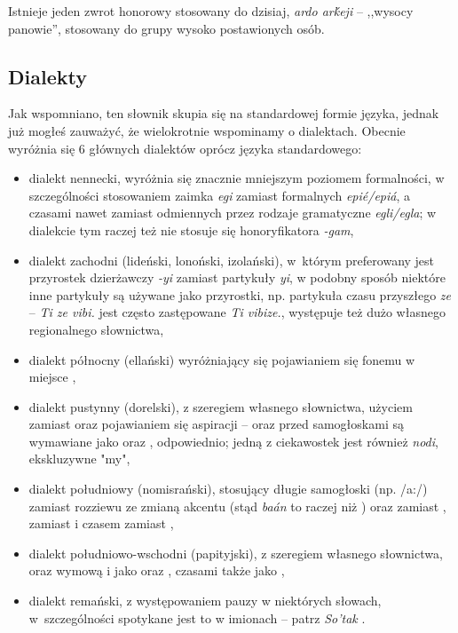 \begin{spacing}{1.1}
Istnieje jeden zwrot honorowy stosowany do dzisiaj, \emph{ardo arḱeji} --
,,wysocy panowie'', stosowany do grupy wysoko postawionych osób.

\subsection{Dialekty}
Jak wspomniano, ten słownik skupia się na standardowej formie języka, jednak już
mogłeś zauważyć, że wielokrotnie wspominamy o dialektach. Obecnie wyróżnia się 6
głównych dialektów oprócz języka standardowego:

\begin{itemize}
    \item dialekt nennecki, wyróżnia się znacznie mniejszym poziomem
    formalności, w szczególności stosowaniem zaimka \emph{egi} zamiast
    formalnych \emph{epié/epiá}, a czasami nawet zamiast odmiennych przez
    rodzaje gramatyczne \emph{egli/egla}; w dialekcie tym raczej też nie stosuje
    się honoryfikatora \emph{-gam},
    \item dialekt zachodni (lideński, lonoński, izolański), w~którym preferowany
    jest przyrostek dzierżawczy \emph{-yi} zamiast partykuły \emph{yi}, w
    podobny sposób niektóre inne partykuły są używane jako przyrostki, np.
    partykuła czasu przyszłego \emph{ze} -- \emph{Ti ze vibi.} jest często
    zastępowane \emph{Ti vibize.}, występuje też dużo własnego regionalnego
    słownictwa,
    \item dialekt północny (ellański) wyróżniający się pojawianiem się fonemu
     w miejsce ,
    \item dialekt pustynny (dorelski), z szeregiem własnego słownictwa, użyciem
     zamiast  oraz pojawianiem się aspiracji --  oraz 
    przed samogłoskami są wymawiane jako  oraz , odpowiednio;
    jedną z ciekawostek jest również \emph{nodi}, ekskluzywne "my",
    \item dialekt południowy (nomisrański), stosujący długie samogłoski (np.
    /a:/) zamiast rozziewu ze zmianą akcentu (stąd \emph{baán} to raczej
     niż ) oraz  zamiast ,  zamiast 
    i czasem  zamiast ,
    \item dialekt południowo-wschodni (papityjski), z szeregiem własnego
    słownictwa, oraz wymową  i  jako  oraz , czasami
    także  jako ,
	\item dialekt remański, z występowaniem pauzy \xt{|} w niektórych słowach,
	w~szczególności spotykane jest to w imionach -- patrz \emph{So'tak}
	.
\end{itemize}


\end{spacing}
